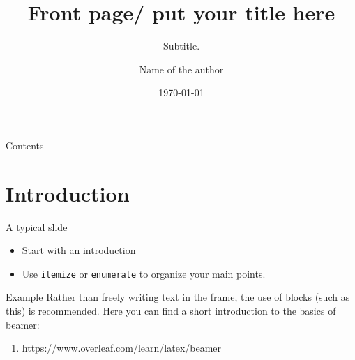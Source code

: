 \documentclass[aspectratio=169]{beamer}
\title[Your Short Title]{Front page/ put your title here}
\subtitle{Subtitle.}
\author{Name of the author}
\date{\today}
\begin{document}
	\maketitle
	\begin{frame}{Contents}
		\tableofcontents
	\end{frame}

	\section{Introduction}
	\begin{frame}{A typical slide}
		\begin{itemize}
			\item Start with an introduction
			\item Use \texttt{itemize} or \texttt{enumerate} to organize your main points.
		\end{itemize}
		\begin{block}{Example}
			Rather than freely writing text in the frame, the use of blocks (such as this) is recommended.
			Here you can find a short introduction to the basics of beamer:
			\begin{enumerate}
				\item https://www.overleaf.com/learn/latex/beamer
			\end{enumerate}
		\end{block}
	\end{frame}
\end{document}
